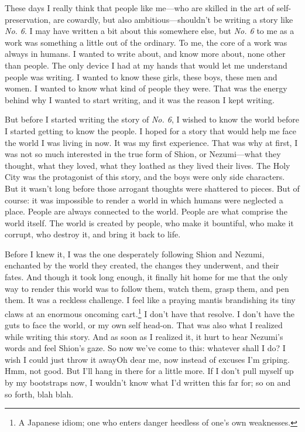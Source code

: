 These days I really think that people like me---who are skilled in the art
of self-preservation, are cowardly, but also ambitious---shouldn't be
writing a story like \emph{No. 6}. I may have written a bit about this
somewhere else, but \emph{No. 6} to me as a work was something a little out of
the ordinary. To me, the core of a work was always in humans. I wanted
to write about, and know more about, none other than people. The only
device I had at my hands that would let me understand people was
writing. I wanted to know these girls, these boys, these men and women.
I wanted to know what kind of people they were. That was the energy
behind why I wanted to start writing, and it was the reason I kept
writing.

But before I started writing the story of \emph{No. 6}, I wished to know the
world before I started getting to know the people. I hoped for a story
that would help me face the world I was living in now. It was my first
experience. That was why at first, I was not so much interested in the
true form of Shion, or Nezumi---what they thought, what they loved, what
they loathed as they lived their lives. The Holy City was the
protagonist of this story, and the boys were only side characters. But
it wasn't long before those arrogant thoughts were shattered to pieces.
But of course: it was impossible to render a world in which humans were
neglected a place. People are always connected to the world. People are
what comprise the world itself. The world is created by people, who make
it bountiful, who make it corrupt, who destroy it, and bring it back to
life.

Before I knew it, I was the one desperately following Shion and Nezumi,
enchanted by the world they created, the changes they underwent, and
their fates. And though it took long enough, it finally hit home for me
that the only way to render this world was to follow them, watch them,
grasp them, and pen them. It was a reckless challenge. I feel like a
praying mantis brandishing its tiny claws at an enormous oncoming cart.\footnote{A Japanese idiom; one who enters danger heedless of one's own weaknesses.}
I don't have that resolve. I don't have the guts to face the world, or
my own self head-on. That was also what I realized while writing this
story. And as soon as I realized it, it hurt to hear Nezumi's words and
feel Shion's gaze. So now we've come to this: whatever shall I do? I
wish I could just throw it away\el Oh dear me, now instead of excuses
I'm griping. Hmm, not good. But I'll hang in there for a little more. If
I don't pull myself up by my bootstraps now, I wouldn't know what I'd
written this far for; so on and so forth, blah blah.

